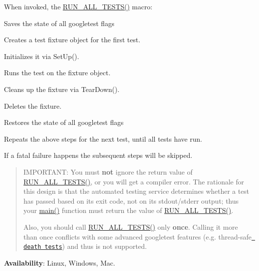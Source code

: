 When invoked, the {\ttfamily \mbox{\hyperlink{gtest_8h_a853a3792807489591d3d4a2f2ff9359f}{R\+U\+N\+\_\+\+A\+L\+L\+\_\+\+T\+E\+S\+T\+S()}}} macro\+:


\begin{DoxyEnumerate}
\item Saves the state of all googletest flags
\end{DoxyEnumerate}
\begin{DoxyItemize}
\item Creates a test fixture object for the first test.
\item Initializes it via {\ttfamily Set\+Up()}.
\item Runs the test on the fixture object.
\item Cleans up the fixture via {\ttfamily Tear\+Down()}.
\item Deletes the fixture.
\item Restores the state of all googletest flags
\item Repeats the above steps for the next test, until all tests have run.
\end{DoxyItemize}

If a fatal failure happens the subsequent steps will be skipped.

\begin{quote}
I\+M\+P\+O\+R\+T\+A\+NT\+: You must {\bfseries{not}} ignore the return value of {\ttfamily \mbox{\hyperlink{gtest_8h_a853a3792807489591d3d4a2f2ff9359f}{R\+U\+N\+\_\+\+A\+L\+L\+\_\+\+T\+E\+S\+T\+S()}}}, or you will get a compiler error. The rationale for this design is that the automated testing service determines whether a test has passed based on its exit code, not on its stdout/stderr output; thus your {\ttfamily \mbox{\hyperlink{3_814_83_2CompilerIdC_2CMakeCCompilerId_8c_a0ddf1224851353fc92bfbff6f499fa97}{main()}}} function must return the value of {\ttfamily \mbox{\hyperlink{gtest_8h_a853a3792807489591d3d4a2f2ff9359f}{R\+U\+N\+\_\+\+A\+L\+L\+\_\+\+T\+E\+S\+T\+S()}}}.

Also, you should call {\ttfamily \mbox{\hyperlink{gtest_8h_a853a3792807489591d3d4a2f2ff9359f}{R\+U\+N\+\_\+\+A\+L\+L\+\_\+\+T\+E\+S\+T\+S()}}} only {\bfseries{once}}. Calling it more than once conflicts with some advanced googletest features (e.\+g. thread-\/safe \href{advanced\#death-tests}{\texttt{ death tests}}) and thus is not supported. \end{quote}


{\bfseries{Availability}}\+: Linux, Windows, Mac.

